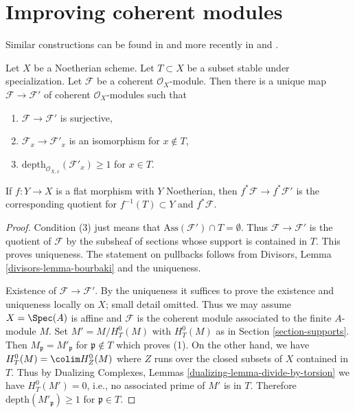 \section{Improving coherent modules}
\label{section-improve}

\noindent
Similar constructions can be found in \cite{EGA} and more recently in
\cite{Kollar-local-global-hulls} and \cite{Kollar-variants}.

\begin{lemma}
\label{lemma-get-depth-1-along-Z}
Let $X$ be a Noetherian scheme. Let $T \subset X$ be a subset
stable under specialization. Let $\mathcal{F}$ be a coherent
$\mathcal{O}_X$-module. Then there is a unique map
$\mathcal{F} \to \mathcal{F}'$ of coherent $\mathcal{O}_X$-modules
such that
\begin{enumerate}
\item $\mathcal{F} \to \mathcal{F}'$ is surjective,
\item $\mathcal{F}_x \to \mathcal{F}'_x$ is an isomorphism for $x \not \in T$,
\item $\text{depth}_{\mathcal{O}_{X, x}}(\mathcal{F}'_x) \geq 1$ for $x \in T$.
\end{enumerate}
If $f : Y \to X$ is a flat morphism with $Y$ Noetherian, then
$f^*\mathcal{F} \to f^*\mathcal{F}'$ is the corresponding
quotient for $f^{-1}(T) \subset Y$ and $f^*\mathcal{F}$.
\end{lemma}

\begin{proof}
Condition (3) just means that $\text{Ass}(\mathcal{F}') \cap T = \emptyset$.
Thus $\mathcal{F} \to \mathcal{F}'$ is the quotient of $\mathcal{F}$
by the subsheaf of sections whose support is contained in $T$.
This proves uniqueness. The statement on pullbacks follows from
Divisors, Lemma \ref{divisors-lemma-bourbaki}
and the uniqueness.

\medskip\noindent
Existence of $\mathcal{F} \to \mathcal{F}'$.
By the uniqueness it suffices to prove the
existence and uniqueness locally on $X$; small detail omitted.
Thus we may assume $X = \Spec(A)$ is affine and $\mathcal{F}$
is the coherent module associated to the finite $A$-module $M$.
Set $M' = M / H^0_T(M)$ with $H^0_T(M)$ as in Section \ref{section-supports}.
Then $M_\mathfrak p = M'_\mathfrak p$ for $\mathfrak p \not \in T$
which proves (1). On the other hand, we have
$H^0_T(M) = \colim H^0_Z(M)$ where $Z$ runs over the closed
subsets of $X$ contained in $T$. Thus by
Dualizing Complexes, Lemmas \ref{dualizing-lemma-divide-by-torsion}
we have $H^0_T(M') = 0$, i.e., no associated prime
of $M'$ is in $T$. Therefore $\text{depth}(M'_\mathfrak p) \geq 1$
for $\mathfrak p \in T$.
\end{proof}

